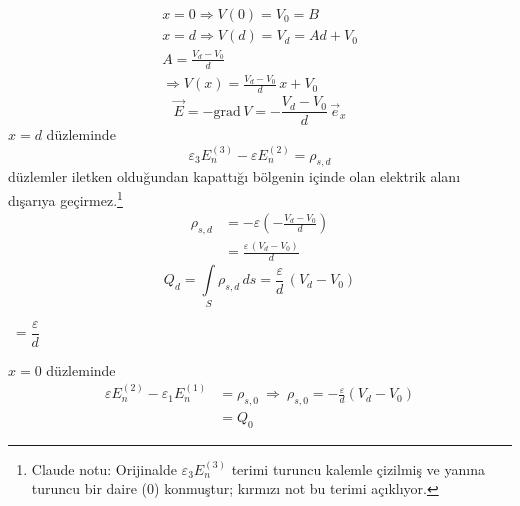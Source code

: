 \documentclass[11pt,a4paper]{article}
\begin{document}
\begin{center}
\end{center}
\begin{gather*}
x=0\Rightarrow V(0)=V_0=B\\
x=d\Rightarrow V(d)=V_d=Ad+V_0\\
A=\frac{V_d-V_0}{d}\\
\Rightarrow V(x)=\frac{V_d-V_0}{d}\,x+V_0
\end{gather*}
\[ \vec E=-\mathrm{grad}\,V=-\frac{V_d-V_0}{d}\,\vec e_x \]
$x=d$ düzleminde
\[ \varepsilon_3E_n^{(3)}-\varepsilon E_n^{(2)}=\rho_{s,d} \]
\textcolor{kirmizikalem}{düzlemler iletken olduğundan kapattığı bölgenin içinde olan elektrik alanı dışarıya geçirmez.}\footnote{Claude notu: Orijinalde $\varepsilon_3E_n^{(3)}$ terimi turuncu kalemle çizilmiş ve yanına turuncu bir daire ($0$) konmuştur; kırmızı not bu terimi açıklıyor.}
\begin{align*}
\rho_{s,d}&=-\varepsilon\left(-\frac{V_d-V_0}{d}\right)\\
&=\frac{\varepsilon\,(V_d-V_0)}{d}
\end{align*}
\[ Q_d=\int\limits_S\rho_{s,d}\,ds=\frac{\varepsilon}{d}\,(V_d-V_0) \]
\begin{center}
$\;=\dfrac{\varepsilon}{d}$
\end{center}
$x=0$ düzleminde
\begin{align*}
\varepsilon E_n^{(2)}-\varepsilon_1E_n^{(1)}&=\rho_{s,0}\ \Rightarrow\ \rho_{s,0}=-\frac{\varepsilon}{d}(V_d-V_0)\\
&=Q_0
\end{align*}
\end{document}
